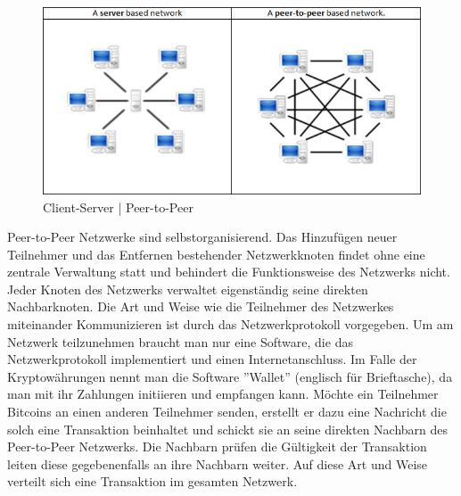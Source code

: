 \begin{figure}[H]
\centering
\includegraphics[width=1\linewidth]{Figures/p2p_networks}
\decoRule
\caption{Client-Server | Peer-to-Peer \cite{wikipedia_p2p}}
\label{fig:p2p_networks}
\end{figure}

Peer-to-Peer Netzwerke sind selbstorganisierend. Das Hinzufügen neuer Teilnehmer und das Entfernen bestehender Netzwerkknoten findet ohne eine zentrale Verwaltung statt und behindert die Funktionsweise des Netzwerks nicht. Jeder Knoten des Netzwerks verwaltet eigenständig seine direkten Nachbarknoten. Die Art und Weise wie die Teilnehmer des Netzwerkes miteinander Kommunizieren ist durch das Netzwerkprotokoll vorgegeben. Um am Netzwerk teilzunehmen braucht man nur eine Software, die das Netzwerkprotokoll implementiert und einen Internetanschluss. Im Falle der Kryptowährungen nennt man die Software ''Wallet'' (englisch für Brieftasche), da man mit ihr Zahlungen initiieren und empfangen kann. Möchte ein Teilnehmer Bitcoins an einen anderen Teilnehmer senden, erstellt er dazu eine Nachricht die solch eine Transaktion beinhaltet und schickt sie an seine direkten Nachbarn des Peer-to-Peer Netzwerks. Die Nachbarn prüfen die Gültigkeit der Transaktion leiten diese gegebenenfalls an ihre Nachbarn weiter. Auf diese Art und Weise verteilt sich eine Transaktion im gesamten Netzwerk.


